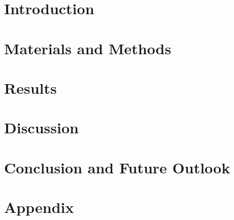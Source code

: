 \documentclass[12pt]{report}
\numberwithin{figure}{chapter}
\begin{document}
\newpage
\tableofcontents 


\chapter{Introduction}


\chapter{Materials and Methods}



\chapter{Results}

\chapter{Discussion}

                       
\chapter{Conclusion and Future Outlook}
\newpage


\chapter*{Appendix}
\end{document}
